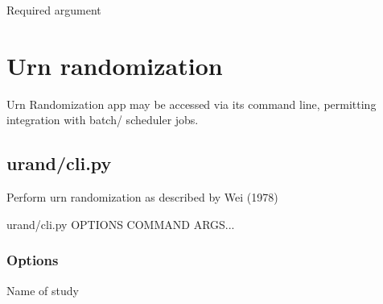 \documentclass[letterpaper,10pt,english]{sphinxmanual}
\begin{document}
\begin{fulllineitems}
\label{\detokenize{cli:cmdoption-urand_gui-cli.py-delete_user-arg-EMAIL}}
Required argument

\end{fulllineitems}



\section{Urn randomization}
\label{\detokenize{cli:urn-randomization}}
Urn Randomization app may be accessed via its command line, permitting integration with batch/ scheduler jobs.


\subsection{urand/cli.py}
\label{\detokenize{cli:urand-cli-py}}
Perform urn randomization as described by Wei (1978)

\begin{sphinxVerbatim}[commandchars=\\\{\}]
urand/cli.py \PYG{o}{[}OPTIONS\PYG{o}{]} COMMAND \PYG{o}{[}ARGS\PYG{o}{]}...
\end{sphinxVerbatim}
\subsubsection*{Options}

\begin{fulllineitems}
\label{\detokenize{cli:cmdoption-urand-cli.py-s}}
 Name of study

\end{fulllineitems}
\end{document}
